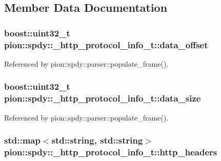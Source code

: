 \subsection{Member Data Documentation}
\hypertarget{structpion_1_1spdy_1_1__http__protocol__info__t_ac7eaf2e8f75959697589437fa27dff9a}{
\subsubsection[{data\-\_\-offset}]{\setlength{\rightskip}{0pt plus 5cm}boost\-::uint32\-\_\-t pion\-::spdy\-::\-\_\-http\-\_\-protocol\-\_\-info\-\_\-t\-::data\-\_\-offset}}\label{structpion_1_1spdy_1_1__http__protocol__info__t_ac7eaf2e8f75959697589437fa27dff9a}


Referenced by pion\-::spdy\-::parser\-::populate\-\_\-frame().

\hypertarget{structpion_1_1spdy_1_1__http__protocol__info__t_a9f92f9f33b30a85ed7fd1758206d632e}{
\subsubsection[{data\-\_\-size}]{\setlength{\rightskip}{0pt plus 5cm}boost\-::uint32\-\_\-t pion\-::spdy\-::\-\_\-http\-\_\-protocol\-\_\-info\-\_\-t\-::data\-\_\-size}}\label{structpion_1_1spdy_1_1__http__protocol__info__t_a9f92f9f33b30a85ed7fd1758206d632e}


Referenced by pion\-::spdy\-::parser\-::populate\-\_\-frame().

\hypertarget{structpion_1_1spdy_1_1__http__protocol__info__t_aa5fe851be6df6f20882ecfb4b0a17173}{
\subsubsection[{http\-\_\-headers}]{\setlength{\rightskip}{0pt plus 5cm}std\-::map$<$std\-::string, std\-::string$>$ pion\-::spdy\-::\-\_\-http\-\_\-protocol\-\_\-info\-\_\-t\-::http\-\_\-headers}}\label{structpion_1_1spdy_1_1__http__protocol__info__t_aa5fe851be6df6f20882ecfb4b0a17173}


